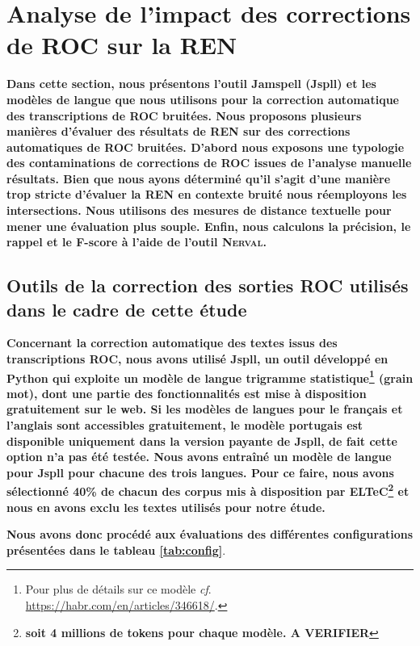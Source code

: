
\section{Analyse de l'impact des corrections de ROC sur la REN}
\label{sec:COR-OCR-IMPACT-NER}

\textbf{Dans cette section, nous présentons l'outil Jamspell (Jspll) et les modèles de langue que nous utilisons pour la correction automatique des transcriptions de ROC bruitées. Nous proposons plusieurs manières d'évaluer des résultats de REN sur des  corrections automatiques de ROC bruitées. D'abord nous exposons une typologie des contaminations de corrections de ROC issues de l'analyse manuelle résultats. Bien que nous ayons déterminé qu'il s'agit d'une manière trop stricte d'évaluer la REN en contexte bruité nous réemployons les intersections. Nous utilisons  des mesures de distance textuelle pour mener une évaluation plus souple. Enfin, nous calculons la précision, le rappel et le F-score à l'aide de l'outil \textsc{Nerval}.}

\subsection{Outils de la correction des sorties ROC utilisés dans le cadre de cette étude}
\label{subsec:outils_COR-OCR-IMPACT-NER}
\textbf{Concernant la correction automatique des textes issus des transcriptions ROC, nous avons utilisé Jspll, un outil développé en Python qui exploite un modèle de langue trigramme statistique\footnote{Pour plus de détails sur ce modèle \textit{cf}. \url{https://habr.com/en/articles/346618/}.} (grain mot), dont une partie des fonctionnalités est mise à disposition gratuitement sur le web.
Si les modèles de langues pour le français et l'anglais sont accessibles gratuitement, le modèle portugais est disponible uniquement dans la version payante de Jspll, de fait cette option n'a pas été testée.
Nous avons entraîné un modèle de langue pour Jspll pour chacune des trois langues. Pour ce faire, nous avons sélectionné 40\% de chacun des corpus mis à disposition par ELTeC\footnote{\textbf{soit 4 millions de tokens pour chaque modèle. A VERIFIER}} et nous en avons exclu les textes utilisés pour notre étude.}

\textbf{Nous avons donc procédé aux évaluations des différentes configurations présentées dans le tableau \ref{tab:config}}.

